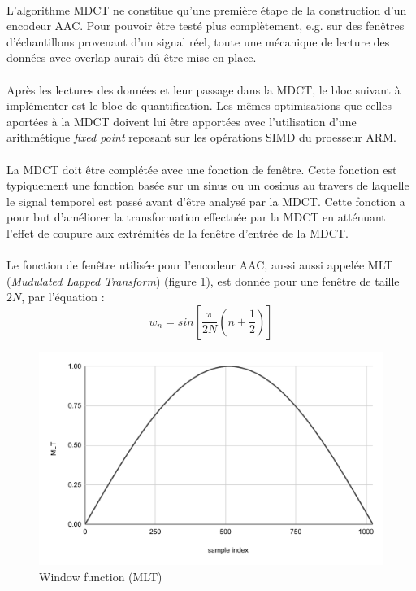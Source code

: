 \documentclass{article}
\begin{document}
    \paragraph{}
    L'algorithme MDCT ne constitue qu'une première étape de la construction d'un encodeur AAC. Pour pouvoir être testé plus complètement, e.g. sur des fenêtres d'échantillons provenant d'un signal réel, toute une mécanique de lecture des données avec overlap aurait dû être mise en place.
    
    \paragraph{}
    Après les lectures des données et leur passage dans la MDCT, le bloc suivant à implémenter est le bloc de quantification. Les mêmes optimisations que celles aportées à la MDCT doivent lui être apportées avec l'utilisation d'une arithmétique \emph{fixed point} reposant sur les opérations SIMD du proesseur ARM.

    \paragraph{}
    La MDCT doit être complétée avec une fonction de fenêtre. Cette fonction est typiquement une fonction basée sur un sinus ou un cosinus au travers de laquelle le signal temporel est passé avant d'être analysé par la MDCT. Cette fonction a pour but d'améliorer la transformation effectuée par la MDCT en atténuant l'effet de coupure aux extrémités de la fenêtre d'entrée de la MDCT.

    \paragraph{}
    Le fonction de fenêtre utilisée pour l'encodeur AAC, aussi aussi appelée MLT (\emph{Mudulated Lapped Transform}) (figure \ref{fig:mlt}), est donnée pour une fenêtre de taille $2N$, par l'équation :
    $$w_n = sin\left[ \frac{\pi}{2N} \left( n + \frac{1}{2} \right) \right]$$
    \begin{figure}[H]
        \centering
        \includegraphics[width=.8\linewidth]{./images/mlt.pdf}
        \caption{Window function (MLT)}
        \label{fig:mlt}
    \end{figure}
\end{document}
